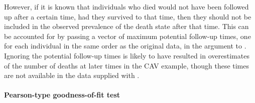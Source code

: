 However, if it is known that individuals who died would not have been
followed up after a certain time, had they survived to that time, then
they should not be included in the observed prevalence of the death
state after that time.  This can be accounted for by passing a vector
of maximum potential follow-up times, one for each individual in the
same order as the original data, in the  argument to
.  Ignoring the potential follow-up times is
likely to have resulted in overestimates of the number of deaths
at later times in the CAV example, though these times are not
available in the data supplied with .


\paragraph{Pearson-type goodness-of-fit test}
\label{sec:pearson}

